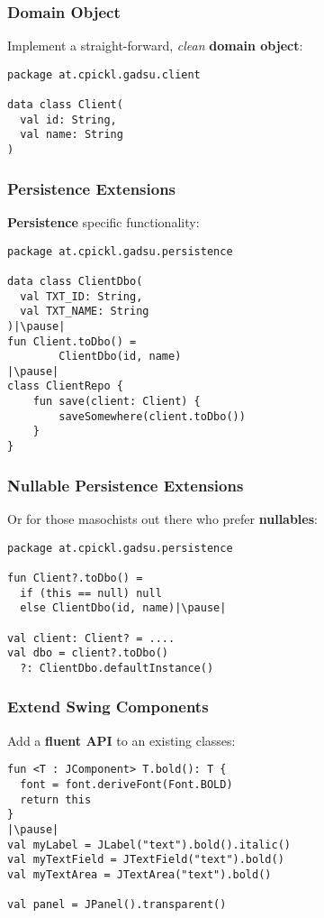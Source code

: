 

  

\begin{frame}[fragile] \frametitle{Domain Object}
Implement a straight-forward, \textit{clean} \textbf{domain object}:
\begin{lstlisting}
package at.cpickl.gadsu.client

data class Client(
  val id: String,
  val name: String
)
\end{lstlisting}
\end{frame}

\begin{frame}[fragile] \frametitle{Persistence Extensions}
\textbf{Persistence} specific functionality:
\begin{lstlisting}
package at.cpickl.gadsu.persistence

data class ClientDbo(
  val TXT_ID: String,
  val TXT_NAME: String
)|\pause|
fun Client.toDbo() =
        ClientDbo(id, name)
|\pause|
class ClientRepo {
    fun save(client: Client) {
        saveSomewhere(client.toDbo())
    }
}
\end{lstlisting}
\end{frame}

\begin{frame}[fragile] \frametitle{Nullable Persistence Extensions}
Or for those masochists out there who prefer \textbf{nullables}:
\begin{lstlisting}
package at.cpickl.gadsu.persistence

fun Client?.toDbo() = 
  if (this == null) null 
  else ClientDbo(id, name)|\pause|

val client: Client? = ....
val dbo = client?.toDbo()
  ?: ClientDbo.defaultInstance()
\end{lstlisting}
\end{frame}



\begin{frame}[fragile] \frametitle{Extend Swing Components}
Add a \textbf{fluent API} to an existing classes:
\begin{lstlisting}
fun <T : JComponent> T.bold(): T {
  font = font.deriveFont(Font.BOLD)
  return this
}
|\pause|
val myLabel = JLabel("text").bold().italic()
val myTextField = JTextField("text").bold()
val myTextArea = JTextArea("text").bold()

val panel = JPanel().transparent()
\end{lstlisting}
\end{frame}



